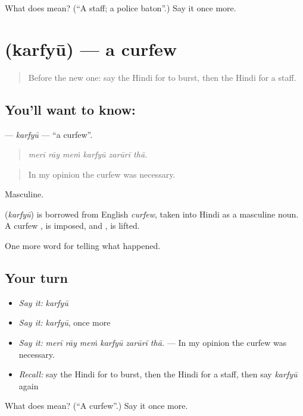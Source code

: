 \begin{tcolorbox}[breakable,colback=teal!4,colframe=teal!35!black,title={Before you move on}]
What does  mean? (\textquotedblleft{}A staff; a police baton\textquotedblright{}.) Say it once more.
\end{tcolorbox}
\section[\texorpdfstring{\hi{कर्फ़्यू} (karfyū)}{कर्फ़्यू (karfyū)}]{ (karfyū) — a curfew}

\label{lesson:HI-C316-karfyu}



\begin{quote}
Before the new one: say the Hindi for to burst, then the Hindi for a staff.
\end{quote}

\subsection*{You'll want to know: }
\textbf{} — \emph{karfyū} — \textquotedblleft{}a curfew\textquotedblright{}.

\begin{quote}
     
\end{quote}

\begin{quote}
\emph{merī rāy meṁ karfyū zarūrī thā.}
\end{quote}

\begin{quote}
In my opinion the curfew was necessary.
\end{quote}

Masculine.

\begin{cousinweb}
\textbf{} (\emph{karfyū}) is borrowed from English \emph{curfew}, taken into Hindi as a masculine noun. A curfew \textbf{ }, is imposed, and \textbf{ }, is lifted.
\end{cousinweb}

\begin{grammarlens}[title={What you've built}]
One more word for telling what happened.
\end{grammarlens}

\subsection*{Your turn}
\begin{itemize}
\raggedright
  \item \emph{Say it:} \emph{karfyū}
  \item \emph{Say it:} \emph{karfyū}, once more
  \item \emph{Say it:} \emph{merī rāy meṁ karfyū zarūrī thā.} — In my opinion the curfew was necessary.
  \item \emph{Recall:} say the Hindi for to burst, then the Hindi for a staff, then say \emph{karfyū} again
\end{itemize}

\begin{tcolorbox}[breakable,colback=teal!4,colframe=teal!35!black,title={Before you move on}]
What does  mean? (\textquotedblleft{}A curfew\textquotedblright{}.) Say it once more.
\end{tcolorbox}
